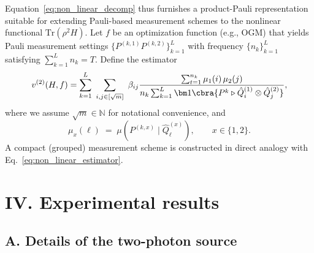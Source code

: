 \documentclass[prl,aps,notitlepage,superscriptaddress,showpacs,nofootinbib]{revtex4-2}
\begin{document}

Equation~\eqref{eq:non_linear_decomp} thus furnishes a product-Pauli representation suitable for extending Pauli-based measurement schemes to the nonlinear functional $\mathrm{Tr}(\rho^2 H)$. 
Let $f$ be an optimization function (e.g., OGM) that yields Pauli measurement settings $\{P^{(k,1)}P^{(k,2)}\}_{k=1}^L$ with frequency $\{n_k\}_{k=1}^L$ satisfying $\sum_{k=1}^L n_k = T$.  Define the estimator
\begin{equation}
    v^{(2)}(H,f)
    = \sum_{k=1}^{L}\ \sum_{i,j\in[\sqrt{m}]}\ \beta_{ij}
      \frac{\sum_{t=1}^{n_k} \mu_1(i)\,\mu_2(j)}{n_k \sum_{k=1}^L \bm 1\cbra{P^{k}\triangleright \hat{Q}_i^{(1)} \otimes \hat{Q}_j^{(2)} }},
    \label{eq:non_linear_estimator}
\end{equation}
where we assume $\sqrt{m}\in\mathbb{N}$ for notational convenience, and
\[
\mu_x(\ell)\;=\;\mu\!\left(P^{(k,x)}\mid \widehat{Q}^{(x)}_{\ell}\right),\qquad x\in\{1,2\}.
\]
A compact (grouped) measurement scheme is constructed in direct analogy with Eq.~\eqref{eq:non_linear_estimator}.



\section{IV. Experimental results}

\subsection{A. Details of the two-photon source}
\end{document}
